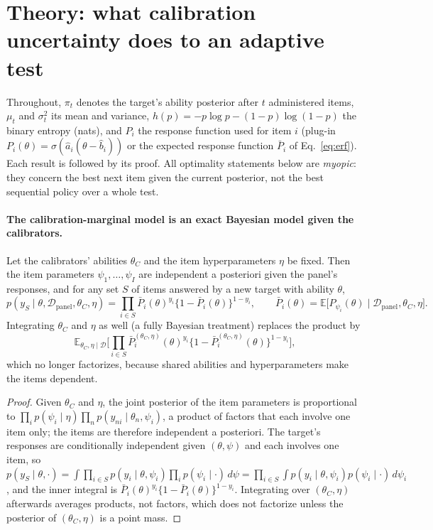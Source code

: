 \section{Theory: what calibration uncertainty does to an adaptive test}
\label{sec:theory}

Throughout, $\pi_t$ denotes the target's ability posterior after $t$ administered
items, $\mu_t$ and $\sigma_t^2$ its mean and variance, $h(p)=-p\log p-(1-p)\log(1-p)$
the binary entropy (nats), and $P_i$ the response function used for item $i$
(plug-in $P_i(\theta)=\sigma(\hat a_i(\theta-\hat b_i))$ or the expected response
function $\bar P_i$ of Eq.~\eqref{eq:erf}). Each result is followed by
its proof.
All optimality statements below are \emph{myopic}: they concern the best next item
given the current posterior, not the best sequential policy over a whole test.

\paragraph{The calibration-marginal model is an exact Bayesian model given the calibrators.}
\begin{lemma}\label{lem:exact}
Let the calibrators' abilities $\theta_C$ and the item hyperparameters $\eta$ be fixed.
Then the item parameters $\psi_1,\dots,\psi_I$ are independent a posteriori given the
panel's responses, and for any set $S$ of items answered by a new target with ability
$\theta$,
\begin{equation}\label{eq:factor}
p(y_S\mid\theta,\mathcal D_{\mathrm{panel}},\theta_C,\eta)=\prod_{i\in S}\bar P_i(\theta)^{y_i}\{1-\bar P_i(\theta)\}^{1-y_i},
\qquad \bar P_i(\theta)=\mathbb E\big[P_{\psi_i}(\theta)\mid\mathcal D_{\mathrm{panel}},\theta_C,\eta\big].
\end{equation}
Integrating $\theta_C$ and $\eta$ as well (a fully Bayesian treatment) replaces the
product by
\[
\mathbb E_{\theta_C,\eta\mid\mathcal D}\Big[\prod_{i\in S}\bar P_i^{(\theta_C,\eta)}(\theta)^{y_i}\{1-\bar P_i^{(\theta_C,\eta)}(\theta)\}^{1-y_i}\Big],
\]
which no longer factorizes, because shared abilities and hyperparameters make the items
dependent.
\end{lemma}

\begin{proof}
Given $\theta_C$ and $\eta$, the joint posterior of the item parameters is proportional
to $\prod_i p(\psi_i\mid\eta)\prod_{n}p(y_{ni}\mid\theta_n,\psi_i)$, a product of factors that
each involve one item only; the items are therefore independent a posteriori. The
target's responses are conditionally independent given $(\theta,\psi)$ and each involves
one item, so
$p(y_S\mid\theta,\cdot)=\int\prod_{i\in S}p(y_i\mid\theta,\psi_i)\prod_i p(\psi_i\mid\cdot)\,d\psi
=\prod_{i\in S}\int p(y_i\mid\theta,\psi_i)p(\psi_i\mid\cdot)\,d\psi_i$, and the inner integral
is $\bar P_i(\theta)^{y_i}\{1-\bar P_i(\theta)\}^{1-y_i}$. Integrating over
$(\theta_C,\eta)$ afterwards averages products, not factors, which does not factorize
unless the posterior of $(\theta_C,\eta)$ is a point mass.
\end{proof}

